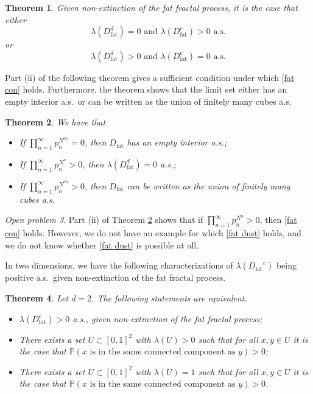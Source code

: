 \documentclass[11pt,a4paper]{article}
\newcommand{\IP}{\ensuremath{\mathbb{P}}}
\newcommand{\Dfat}{\ensuremath{D_{\text{fat}}}}
\newcommand{\Dfatc}{\ensuremath{D_{\text{fat}}^{c}}}
\newcommand{\Dfatd}{\ensuremath{D_{\text{fat}}^{d}}}
\newtheorem{theorem}{Theorem}[section]
\theoremstyle{remark}
\newtheorem{openproblem}[theorem]{Open problem}
\begin{document}
\begin{theorem}\label{thm lebesgue}
Given non-extinction of the fat fractal process, it is the case that either 
\begin{equation}\label{fat con}
\lambda(\Dfatd) =0 \text{ and } \lambda(\Dfatc)>0 \text{ a.s.}                                                                              
\end{equation}
 or
\begin{equation}\label{fat dust}
\lambda(\Dfatd) >0 \text{ and } \lambda(\Dfatc)=0 \text{ a.s.}
\end{equation}
\end{theorem}


Part (ii) of the following theorem gives a sufficient condition under which \eqref{fat con} holds. Furthermore, the theorem shows that the limit set either has an empty interior a.s.\ or can be written as the union of finitely many cubes a.s.


\begin{theorem}\label{thm charac} We have that
\begin{itemize}
 \item[$(i)$] If $\prod_{n=1}^{\infty} p_n^{N^{dn}} = 0$, then $\Dfat$ has an empty interior a.s.;
\item[$(ii)$] If $\prod_{n=1}^{\infty} p_n^{N^n} > 0$, then $\lambda(\Dfatd) = 0$ a.s.;
\item[$(iii)$] If $\prod_{n=1}^{\infty} p_n^{N^{dn}} > 0$, then $\Dfat$ can be written as the union of finitely many cubes a.s.
\end{itemize}
\end{theorem}


\begin{openproblem} 
Part (ii) of Theorem \ref{thm charac} shows that if $\prod_{n=1}^{\infty} p_{n}^{N^n} > 0$, then \eqref{fat con} holds. However, we do not have an example for which \eqref{fat dust} holds, and we do not know whether \eqref{fat dust} is possible at all.
\end{openproblem}


In two dimensions, we have the following characterizations of $\lambda(\Dfat^c)$ being positive a.s.\ given non-extinction of the fat fractal process.


\begin{theorem} \label{thm pos prob} Let $d=2$. The following statements are equivalent.
\begin{itemize}
 \item[$(i)$] $\lambda(D^c_{\text{fat}}) > 0$ a.s., given non-extinction of the fat fractal process;
\item[$(ii)$] There exists a set $U\subset [0,1]^2$ with $\lambda(U)>0$ such that for all $x,y \in U$ it is the case that $\IP( x \text{ is in the same connected component as } y) >0$;
\item[$(iii)$] There exists a set $U\subset [0,1]^2$ with $\lambda(U)=1$ such that for all $x,y \in U$ it is the case that $\IP( x \text{ is in the same connected component as } y) >0$.
\end{itemize}
\end{theorem} 
\end{document}
